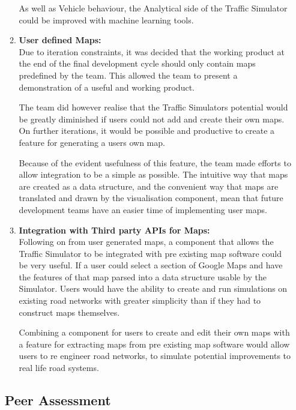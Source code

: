 \documentclass[11pt]{article}
\begin{document}
\begin{enumerate}
\begin{enumerate}
	As well as Vehicle behaviour, the Analytical side of the Traffic Simulator could be improved with machine learning tools.\\
	
	\item \textbf{User defined Maps:} 
	\\
	
	Due to iteration constraints, it was decided that the working product at the end of the final development cycle should only contain maps predefined by the team. This allowed the team to present a demonstration of a useful and working product.
	
	The team did however realise that the Traffic Simulators potential would be greatly diminished if users could not add and create their own maps. On further iterations, it would be possible and productive to create a feature for generating a users own map.
	
	Because of the evident usefulness of this feature, the team made efforts to allow integration to be a simple as possible. The intuitive way that maps are created as a data structure, and the convenient way that maps are translated and drawn by the visualisation component, mean that future development teams have an easier time of implementing user maps.\\
	
	
	\item \textbf{Integration with Third party APIs for Maps:} 
	\\
	
	Following on from user generated maps, a component that allows the Traffic Simulator to be integrated with pre existing map software could be very useful. If a user could select a section of Google Maps and have the features of that map parsed into a data structure usable by the Simulator. Users would have the ability to create and run simulations on existing road networks with greater simplicity than if they had to construct maps themselves.
	
	Combining a component for users to create and edit their own maps with a feature for extracting maps from pre existing map software would allow users to re engineer road networks, to simulate potential improvements to real life road systems.
	
\end{enumerate}

\pagebreak
\subsection{Peer Assessment}


\end{enumerate}
\end{document}
